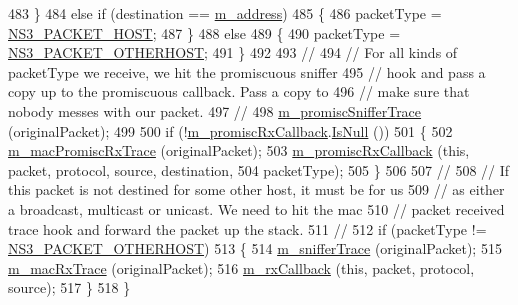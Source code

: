 \begin{DoxyCode}
483     \}
484   \textcolor{keywordflow}{else} \textcolor{keywordflow}{if} (destination == \hyperlink{classns3_1_1FdNetDevice_ad6ce5cc7c15f7a9c79a0c822aea60036}{m\_address})
485     \{
486       packetType = \hyperlink{classns3_1_1NetDevice_ace65153f09144f55a0d3e702fc29d6b2a4f3acc25ea8b98021b5c610b899ae7d8}{NS3\_PACKET\_HOST};
487     \}
488   \textcolor{keywordflow}{else}
489     \{
490       packetType = \hyperlink{classns3_1_1NetDevice_ace65153f09144f55a0d3e702fc29d6b2a16d8e18aea18b500b8f18de6d52c884d}{NS3\_PACKET\_OTHERHOST};
491     \}
492 
493   \textcolor{comment}{//}
494   \textcolor{comment}{// For all kinds of packetType we receive, we hit the promiscuous sniffer}
495   \textcolor{comment}{// hook and pass a copy up to the promiscuous callback.  Pass a copy to}
496   \textcolor{comment}{// make sure that nobody messes with our packet.}
497   \textcolor{comment}{//}
498   \hyperlink{classns3_1_1FdNetDevice_a7f43138ecf824b335eb80eeebdb91eb6}{m\_promiscSnifferTrace} (originalPacket);
499 
500   \textcolor{keywordflow}{if} (!\hyperlink{classns3_1_1FdNetDevice_aa95f558a530aca66f7fe582559902160}{m\_promiscRxCallback}.\hyperlink{classns3_1_1Callback_aa8e27826badbf37f84763f36f70d9b54}{IsNull} ())
501     \{
502       \hyperlink{classns3_1_1FdNetDevice_ac0fbee33fa2dc3d5349f33f794364fdb}{m\_macPromiscRxTrace} (originalPacket);
503       \hyperlink{classns3_1_1FdNetDevice_aa95f558a530aca66f7fe582559902160}{m\_promiscRxCallback} (\textcolor{keyword}{this}, packet, protocol, source, destination,
504                            packetType);
505     \}
506 
507   \textcolor{comment}{//}
508   \textcolor{comment}{// If this packet is not destined for some other host, it must be for us}
509   \textcolor{comment}{// as either a broadcast, multicast or unicast.  We need to hit the mac}
510   \textcolor{comment}{// packet received trace hook and forward the packet up the stack.}
511   \textcolor{comment}{//}
512   \textcolor{keywordflow}{if} (packetType != \hyperlink{classns3_1_1NetDevice_ace65153f09144f55a0d3e702fc29d6b2a16d8e18aea18b500b8f18de6d52c884d}{NS3\_PACKET\_OTHERHOST})
513     \{
514       \hyperlink{classns3_1_1FdNetDevice_a821080a2cc1253e22918e8fcedcfbe58}{m\_snifferTrace} (originalPacket);
515       \hyperlink{classns3_1_1FdNetDevice_a5d526995e92ac4957170d9b8a680bad1}{m\_macRxTrace} (originalPacket);
516       \hyperlink{classns3_1_1FdNetDevice_a5c3e9d04b053c707a4188f823a6bc2ab}{m\_rxCallback} (\textcolor{keyword}{this}, packet, protocol, source);
517     \}
518 \}
\end{DoxyCode}


